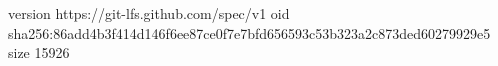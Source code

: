 version https://git-lfs.github.com/spec/v1
oid sha256:86add4b3f414d146f6ee87ce0f7e7bfd656593c53b323a2c873ded60279929e5
size 15926
